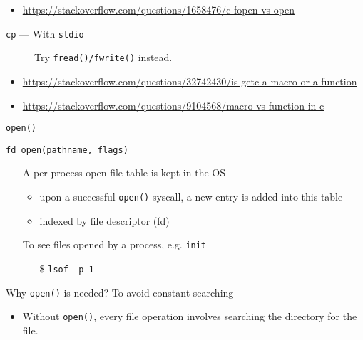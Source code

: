 \begin{itemize}
\item \url{https://stackoverflow.com/questions/1658476/c-fopen-vs-open}
\end{itemize}

\begin{frame}{\texttt{cp} --- {\small With} \texttt{stdio}}
  \begin{center}
  \end{center}
  \begin{description}
  \item[\hw] Try \texttt{fread()/fwrite()} instead.
  \end{description}
\end{frame}

\begin{itemize}
\item \url{https://stackoverflow.com/questions/32742430/is-getc-a-macro-or-a-function}
\item \url{https://stackoverflow.com/questions/9104568/macro-vs-function-in-c}
\end{itemize}



\begin{frame}{\texttt{open()}}
  \begin{block}{\texttt{fd open(pathname, flags)}}
    \begin{itemize}
    \item[] A per-process \alert{open-file table} is kept in the OS
      \begin{itemize}
      \item upon a successful \texttt{open()} syscall, a new entry is added into this table
      \item indexed by \alert{file descriptor (fd)}
      \end{itemize}
    \item[] To see files opened by a process, e.g. \texttt{init}
      \begin{itemize}
      \item[\$] \texttt{lsof -p 1}
      \end{itemize}
    \end{itemize}
  \end{block}
  \begin{block}{Why \texttt{open()} is needed?}
    To avoid constant searching
    \begin{itemize}
    \item Without \texttt{open()}, every file operation involves searching the directory for
      the file.
    \end{itemize}
  \end{block}
\end{frame}

